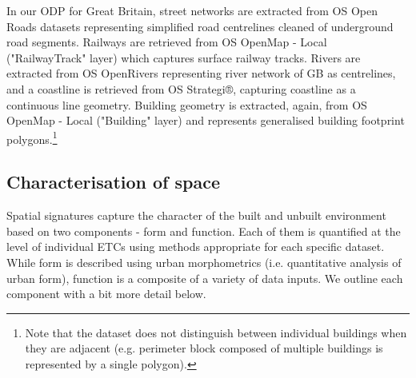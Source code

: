
In our ODP for Great Britain, street networks are extracted from OS
Open Roads datasets\cite{openroads2020} representing simplified road centrelines 
cleaned of underground road segments.
Railways are retrieved from OS OpenMap - Local\cite{openmap2020}
("RailwayTrack" layer) which captures surface railway tracks. Rivers are extracted from
OS OpenRivers\cite{openrivers2020} representing river network of GB as centrelines, and a coastline is
retrieved from OS Strategi®\cite{strategi2016}, capturing coastline as a continuous line
geometry. Building geometry is extracted, again, from OS OpenMap - Local ("Building"
layer) and represents generalised building footprint polygons.\footnote{Note that the dataset
does not distinguish between individual buildings when they are adjacent (e.g. perimeter
block composed of multiple buildings is represented by a single polygon).}

\subsection*{Characterisation of space}
Spatial signatures capture the character of the built and unbuilt environment
based on two components - form and function. Each of them is quantified at the level of
individual ETCs using methods appropriate for each specific dataset. While form
is described using urban morphometrics (i.e. quantitative analysis of urban
form), function is a composite of a variety of data inputs. We outline each
component with a bit more detail below.

